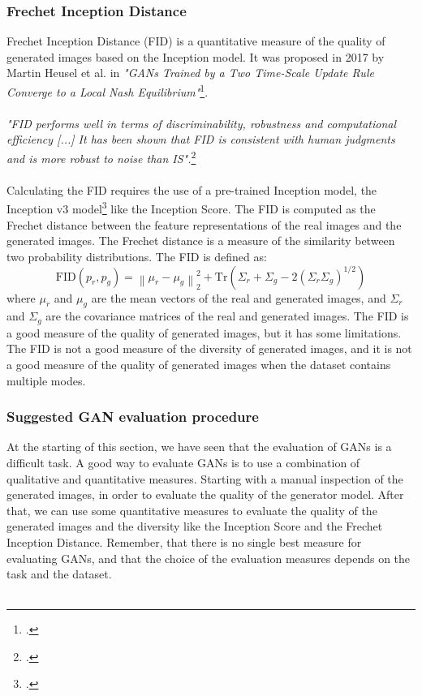 \subsubsection{Frechet Inception Distance}
\label{subsubsec:frechet-inception-distance}
Frechet Inception Distance (FID) is a quantitative measure of the quality of generated images based on the Inception model.
It was proposed in 2017 by Martin Heusel et al. in \emph{"GANs Trained by a Two Time-Scale Update Rule Converge to a Local Nash Equilibrium"}\footcite{paper:heusel2017gans}.\\\\
\emph{"FID performs well in terms of discriminability, robustness and computational efficiency [...] It has been shown that FID is consistent with human judgments and is more robust to noise than IS".}\footcite{paper:ganeval}\\\\
Calculating the FID requires the use of a pre-trained Inception model, the Inception v3 model\footcite{paper:inceptionv3} like the Inception Score.
The FID is computed as the Frechet distance between the feature representations of the real images and the generated images.
The Frechet distance is a measure of the similarity between two probability distributions.
The FID is defined as:
\begin{equation}
    \label{eq:frechet-inception-distance}
    \text{FID}(p_{r}, p_{g}) = \left\| \mu_{r} - \mu_{g} \right\|_{2}^{2} + \text{Tr} \left( \Sigma_{r} + \Sigma_{g} - 2 \left( \Sigma_{r} \Sigma_{g} \right)^{1/2} \right)
\end{equation}
where $\mu_{r}$ and $\mu_{g}$ are the mean vectors of the real and generated images, and $\Sigma_{r}$ and $\Sigma_{g}$ are the covariance matrices of the real and generated images.
The FID is a good measure of the quality of generated images, but it has some limitations.
The FID is not a good measure of the diversity of generated images, and it is not a good measure of the quality of generated images when the dataset contains multiple modes.
\subsubsection{Suggested GAN evaluation procedure}
\label{subsubsec:suggested-gan-evaluation-procedure}
At the starting of this section, we have seen that the evaluation of GANs is a difficult task.
A good way to evaluate GANs is to use a combination of qualitative and quantitative measures.
Starting with a manual inspection of the generated images, in order to evaluate the quality of the generator model.
After that, we can use some quantitative measures to evaluate the quality of the generated images and the diversity like the Inception Score and the Frechet Inception Distance.
Remember, that there is no single best measure for evaluating GANs, and that the choice of the evaluation measures depends on the task and the dataset.\\\\

